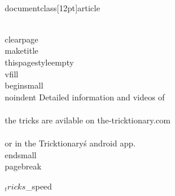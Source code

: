 \\documentclass[12pt]{article}
\begin{document}
  \\clearpage\\maketitle
  \\thispagestyle{empty}
  \\vfill
  \\begin{small}
    \\noindent Detailed information and videos of \\\\
    the tricks are avilable on the-tricktionary.com \\\\
    or in the Tricktionary\'s android app.
  \\end{small}
  \\pagebreak

  ${_tricks}

  ${_speed}

\
\end{document}
